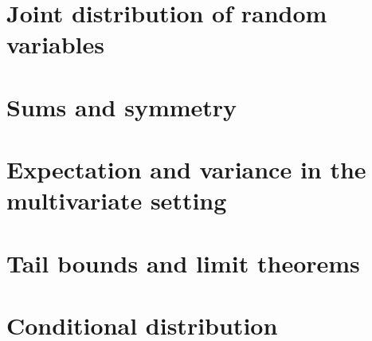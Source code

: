 
\section{Joint distribution of random variables}
\label{sec:joint-distr-rand}


\section{Sums and symmetry}
\label{sec:sums-symmetry}


\section{Expectation and variance in the multivariate setting}
\label{sec:expect-vari-mult}


\section{Tail bounds and limit theorems}
\label{sec:tail-bounds-limit}


\section{Conditional distribution}
\label{sec:cond-distr}





